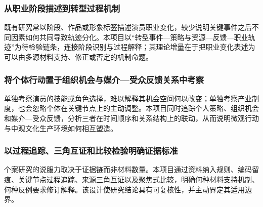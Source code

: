 \justifying
\NSFCBodyText

\subsubsection{从职业阶段描述到转型过程机制}
既有研究常以阶段、作品或形象标签描述演员职业变化，较少说明关键事件之后不同因素如何共同导致轨迹分化。本项目以“转型事件---策略与资源---反馈---职业轨迹”为待检验链条，连接阶段识别与过程解释；其理论增量在于把职业变化表述为可以由多源材料支持、修正或否定的机制命题。

\subsubsection{将个体行动置于组织机会与媒介---受众反馈关系中考察}
单独考察演员的技能或角色选择，难以解释其机会空间何以改变；单独考察产业制度，也会忽略个体在关键节点上的主动调整。本项目同时追踪个人策略、组织机会和媒介---受众反馈，分析三者在时间顺序和关系结构上的联动，从而说明微观行动与中观文化生产环境如何相互塑造。

\subsubsection{以过程追踪、三角互证和比较检验明确证据标准}
个案研究的说服力取决于证据链而非材料数量。本项目通过资料纳入规则、编码留痕、关键节点过程追踪、来源三角互证以及聚焦式比较，明确何种材料支持机制、何种反例要求修订解释。该设计使研究结论具有可复核性，并主动界定其适用边界。
